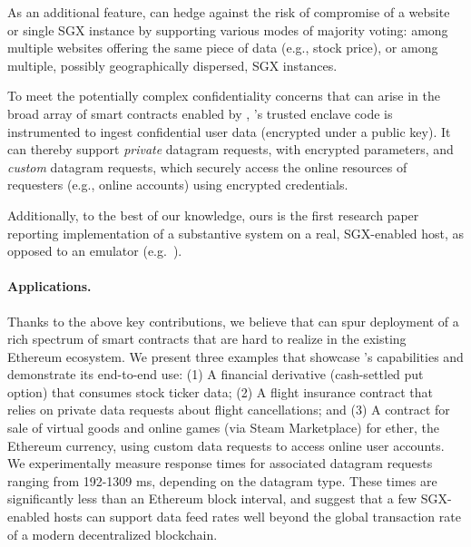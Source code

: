 As an additional feature, \tc can hedge against the risk of compromise of a website or single SGX instance
by supporting various modes of majority voting:
among multiple websites offering the same piece of data (e.g., stock price),
or among multiple, possibly geographically dispersed, SGX instances.

\vspace{1ex}
To meet the potentially complex confidentiality concerns that can arise in the broad array of smart contracts enabled by \tc,
\tc's trusted enclave code is instrumented to ingest confidential user data (encrypted under a \tc public key).
It can thereby support {\em private} datagram requests, with encrypted parameters, and {\em custom} datagram requests,
which securely access the online resources of requesters (e.g., online accounts) using encrypted credentials.

\vspace{1ex}
Additionally, to the best of our knowledge, ours is the first research paper reporting implementation of a substantive system on a real, SGX-enabled host, as opposed to an emulator (e.g.~\cite{haven,VC3}).

\paragraph{Applications.} Thanks to the above key contributions, we believe that \tc can spur deployment of a rich spectrum of smart contracts that are hard to realize in the existing Ethereum ecosystem. We present three examples that showcase \tc's capabilities and demonstrate its end-to-end use: (1) A financial derivative (cash-settled put option) that consumes stock ticker data; (2) A flight insurance contract that relies on private data requests about flight cancellations; and (3) A contract for sale of virtual goods and online games (via Steam Marketplace) for ether, the Ethereum currency, using custom data requests to access online user accounts. We experimentally measure response times for associated datagram requests ranging from 192-1309 ms, depending on the datagram type. These times are significantly less than an Ethereum block interval, and suggest that a few SGX-enabled hosts can support \tc data feed rates well beyond the global transaction rate of a modern decentralized blockchain.

